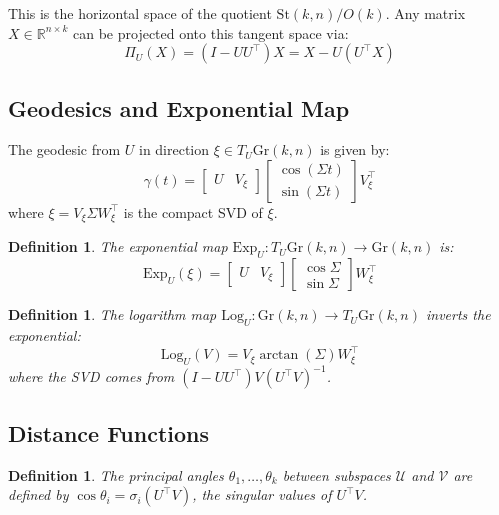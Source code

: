 \documentclass[11pt,a4paper]{article}
\newtheorem{definition}[theorem]{Definition}
\newcommand{\Gr}{\mathrm{Gr}}
\newcommand{\R}{\mathbb{R}}
\newcommand{\Exp}{\mathrm{Exp}}
\newcommand{\Log}{\mathrm{Log}}
\begin{document}
This is the horizontal space of the quotient $\mathrm{St}(k,n)/O(k)$. Any matrix $X \in \R^{n \times k}$ can be projected onto this tangent space via:
\begin{equation}
    \Pi_U(X) = (I - UU^\top)X = X - U(U^\top X)
\end{equation}

\subsection{Geodesics and Exponential Map}

The geodesic from $U$ in direction $\xi \in T_U\Gr(k,n)$ is given by:
\begin{equation}
    \gamma(t) = \begin{bmatrix} U & V_\xi \end{bmatrix}
    \begin{bmatrix} \cos(\Sigma t) \\ \sin(\Sigma t) \end{bmatrix} V_\xi^\top
\end{equation}
where $\xi = V_\xi \Sigma W_\xi^\top$ is the compact SVD of $\xi$.

\begin{definition}
The \emph{exponential map} $\Exp_U: T_U\Gr(k,n) \to \Gr(k,n)$ is:
\begin{equation}
    \Exp_U(\xi) = \begin{bmatrix} U & V_\xi \end{bmatrix}
    \begin{bmatrix} \cos \Sigma \\ \sin \Sigma \end{bmatrix} W_\xi^\top
\end{equation}
\end{definition}

\begin{definition}
The \emph{logarithm map} $\Log_U: \Gr(k,n) \to T_U\Gr(k,n)$ inverts the exponential:
\begin{equation}
    \Log_U(V) = V_\xi \arctan(\Sigma) W_\xi^\top
\end{equation}
where the SVD comes from $(I - UU^\top)V(U^\top V)^{-1}$.
\end{definition}

\subsection{Distance Functions}

\begin{definition}
The \emph{principal angles} $\theta_1, \ldots, \theta_k$ between subspaces $\mathcal{U}$ and $\mathcal{V}$ are defined by $\cos\theta_i = \sigma_i(U^\top V)$, the singular values of $U^\top V$.
\end{definition}
\end{document}
